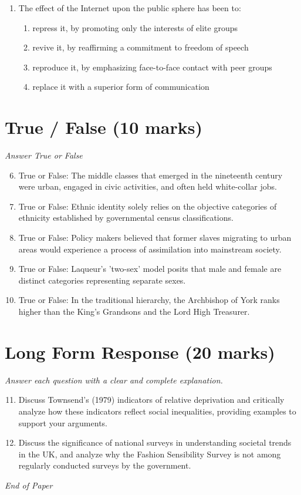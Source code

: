 \documentclass[12pt]{article}
\begin{document}
\begin{enumerate}[label=\arabic*.]
\begin{enumerate}[label=(\alph*)]
    \item a decline in the birth rate, greater life expectancy, and an ageing population
\end{enumerate}
\item The effect of the Internet upon the public sphere has been to:
\begin{enumerate}[label=(\alph*)]
    \item repress it, by promoting only the interests of elite groups
    \item revive it, by reaffirming a commitment to freedom of speech
    \item reproduce it, by emphasizing face-to-face contact with peer groups
    \item replace it with a superior form of communication
\end{enumerate}
\end{enumerate}

\section*{True / False (10 marks)}
\textit{Answer True or False}
\begin{enumerate}[label=\arabic*.]
\setcounter{enumi}{5}
\item True or False: The middle classes that emerged in the nineteenth century were urban, engaged in civic activities, and often held white-collar jobs.
\item True or False: Ethnic identity solely relies on the objective categories of ethnicity established by governmental census classifications.
\item True or False: Policy makers believed that former slaves migrating to urban areas would experience a process of assimilation into mainstream society.
\item True or False: Laqueur's 'two-sex' model posits that male and female are distinct categories representing separate sexes.
\item True or False: In the traditional hierarchy, the Archbishop of York ranks higher than the King's Grandsons and the Lord High Treasurer.
\end{enumerate}

\section*{Long Form Response (20 marks)}
\textit{Answer each question with a clear and complete explanation.}
\begin{enumerate}[label=\arabic*.]
\setcounter{enumi}{10}
\item Discuss Townsend's (1979) indicators of relative deprivation and critically analyze how these indicators reflect social inequalities, providing examples to support your arguments.
\item Discuss the significance of national surveys in understanding societal trends in the UK, and analyze why the Fashion Sensibility Survey is not among regularly conducted surveys by the government.
\end{enumerate}

\vfill
\noindent\textit{End of Paper}
\end{document}
